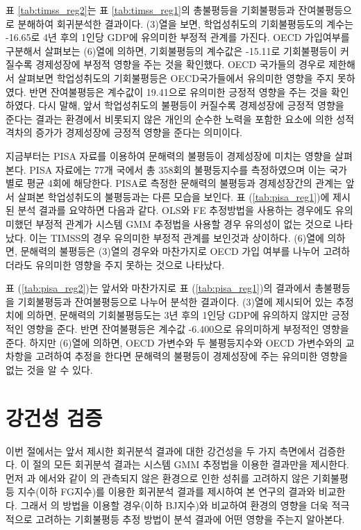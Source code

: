 

표 \ref{tab:timss_reg2}는 표 \ref{tab:timss_reg1}의 총불평등을 기회불평등과 잔여불평등으로 분해하여 회귀분석한 결과이다.
(3)열을 보면, 학업성취도의 기회불평등도의 계수는 -16.65로 4년 후의 1인당 GDP에 유의미한 부정적 관계를 가진다.
OECD 가입여부를 구분해서 살펴보는 (6)열에 의하면, 기회불평등의 계수값은 -15.11로 기회불평등이 커질수록 경제성장에 부정적 영향을 주는 것을 확인했다.
OECD 국가들의 경우로 제한해서 살펴보면 학업성취도의 기회불평등은 OECD국가들에서 유의미한 영향을 주지 못하였다. 
반면 잔여불평등은 계수값이 19.41으로 유의미한 긍정적 영향을 주는 것을 확인하였다.
다시 말해, 앞서 학업성취도의 불평등이 커질수록 경제성장에 긍정적 영향을 준다는 결과는 환경에서 비롯되지 않은 개인의 순수한 노력을 포함한 요소에 의한 성적 격차의 증가가 경제성장에 긍정적 영향을 준다는 의미이다.



지금부터는 PISA 자료를 이용하여 문해력의 불평등이 경제성장에 미치는 영향을 살펴본다.
PISA 자료에는 77개 국에서 총 358회의 불평등지수를 측정하였으며 이는 국가별로 평균 4회에 해당한다.
PISA로 측정한 문해력의 불평등과 경제성장간의 관계는 앞서 살펴본 학업성취도의 불평등과는 다른 모습을 보인다.
표 (\ref{tab:pisa_reg1})에 제시된 분석 결과를 요약하면 다음과 같다.
OLS와 FE 추정방법을 사용하는 경우에도 유의미했던 부정적 관계가 시스템 GMM 추정법을 사용할 경우 유의성이 없는 것으로 나타났다.
이는 TIMSS의 경우 유의미한 부정적 관계를 보인것과 상이하다.
(6)열에 의하면, 문해력의 불평등은 (3)열의 경우와 마찬가지로 OECD 가입 여부를 나누어 고려하더라도 유의미한 영향을 주지 못하는 것으로 나타났다.



표 (\ref{tab:pisa_reg2})는 앞서와 마찬가지로 표 (\ref{tab:pisa_reg1})의 결과에서 총불평등을 기회불평등과 잔여불평등으로 나누어 분석한 결과이다.
(3)열에 제시되어 있는 추정치에 의하면, 문해력의 기회불평등도는 3년 후의 1인당 GDP에 유의하지 않지만 긍정적인 영향을 준다.
반면 잔여불평등은 계수값 -6.400으로 유의미하게 부정적인 영향을 준다.
하지만 (6)열에 의하면, OECD 가변수와 두 불평등지수와 OECD 가변수와의 교차항을 고려하여 추정을 한다면 문해력의 불평등이 경제성장에 주는 유의미한 영향을 없는 것을 알 수 있다.

\section{강건성 검증}

이번 절에서는 앞서 제시한 회귀분석 결과에 대한 강건성을 두 가지 측면에서 검증한다. 이 절의 모든 회귀분석 결과는 시스템 GMM 추정법을 이용한 결과만을 제시한다.
먼저 \citet{mnr13}과 \citet{kno17}에서와 같이 \citet{fng11}의 관측되지 않은 환경으로 인한 성취를 고려하지 않은 기회불평등 지수(이하 FG지수)를 이용한 회귀분석 결과를 제시하여 본 연구의 결과와 비교한다.
그래서 \citet{betl12}의 방법을 이용할 경우(이하 BJ지수)와 비교하여 환경의 영향을 더욱 적극적으로 고려하는 기회불평등 추정 방법이 분석 결과에 어떤 영향을 주는지 알아본다.

